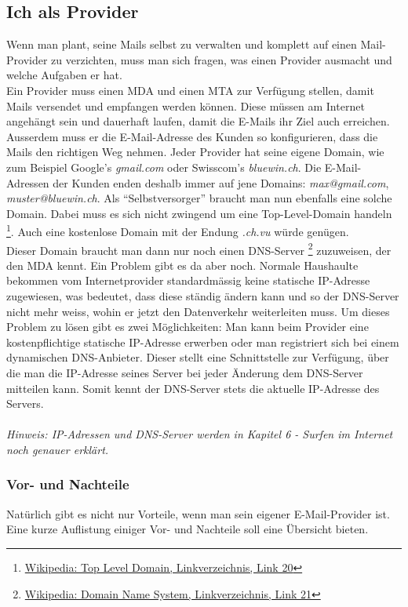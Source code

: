 \subsection{Ich als Provider}
Wenn man plant, seine Mails selbst zu verwalten und komplett auf einen Mail-Provider zu verzichten, muss man sich fragen, was einen Provider ausmacht und welche Aufgaben er hat.
\\
Ein Provider muss einen MDA und einen MTA zur Verfügung stellen, damit Mails versendet und empfangen werden können. Diese müssen am Internet angehängt sein und dauerhaft laufen, damit die E-Mails ihr Ziel auch erreichen.
\\
Ausserdem muss er die E-Mail-Adresse des Kunden so konfigurieren, dass die Mails den richtigen Weg nehmen. Jeder Provider hat seine eigene Domain, wie zum Beispiel Google's \textit{gmail.com} oder Swisscom's \textit{bluewin.ch}. Die E-Mail-Adressen der Kunden enden deshalb immer auf jene Domains: \textit{max@gmail.com}, \textit{muster@bluewin.ch}. Als ``Selbstversorger'' braucht man nun ebenfalls eine solche Domain. Dabei muss es sich nicht zwingend um eine Top-Level-Domain handeln \footnote{\hyperlink{link20}{Wikipedia: Top Level Domain, Linkverzeichnis, Link 20}}. Auch eine kostenlose Domain mit der Endung \textit{.ch.vu} würde genügen.
\\
Dieser Domain braucht man dann nur noch einen DNS-Server \footnote{\hyperlink{link21}{Wikipedia: Domain Name System, Linkverzeichnis, Link 21}} zuzuweisen, der den MDA kennt.
Ein Problem gibt es da aber noch. Normale Haushaulte bekommen vom Internetprovider standardmässig keine statische IP-Adresse zugewiesen, was bedeutet, dass diese ständig ändern kann und so der DNS-Server nicht mehr weiss, wohin er jetzt den Datenverkehr weiterleiten muss. Um dieses Problem zu lösen gibt es zwei Möglichkeiten: Man kann beim Provider eine kostenpflichtige statische IP-Adresse erwerben oder man registriert sich bei einem dynamischen DNS-Anbieter. Dieser stellt eine Schnittstelle zur Verfügung, über die man die IP-Adresse seines Server bei jeder Änderung dem DNS-Server mitteilen kann. Somit kennt der DNS-Server stets die aktuelle IP-Adresse des Servers.
\\
\\
\textit{Hinweis: IP-Adressen und DNS-Server werden in Kapitel 6 - Surfen im Internet noch genauer erklärt.}

\subsubsection{Vor- und Nachteile}
Natürlich gibt es nicht nur Vorteile, wenn man sein eigener E-Mail-Provider ist. Eine kurze Auflistung einiger Vor- und Nachteile soll eine Übersicht bieten.
\\

